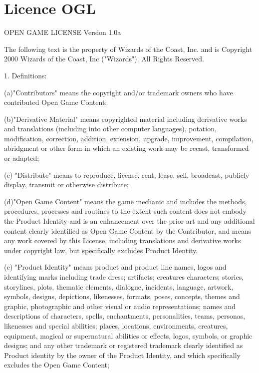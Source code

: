 \documentclass[11pt]{article}
\begin{document}
\newpage
{}\section*{Licence OGL}
\label{OGL}

OPEN GAME LICENSE Version 1.0a

\bigskip

The following text is the property of Wizards of the Coast, Inc. and is Copyright 2000 Wizards of the Coast, Inc ("Wizards"). All Rights Reserved.

\bigskip

1. Definitions:

\bigskip

(a)"Contributors" means the copyright and/or trademark owners who have contributed Open Game Content;

\bigskip

(b)"Derivative Material" means copyrighted material including derivative works and translations (including into other computer languages), potation, modification, correction, addition, extension, upgrade, improvement, compilation, abridgment or other form in which an existing work may be recast, transformed or adapted;

\bigskip

(c) "Distribute" means to reproduce, license, rent, lease, sell, broadcast, publicly display, transmit or otherwise distribute;

\bigskip

(d)"Open Game Content" means the game mechanic and includes the methods, procedures, processes and routines to the extent such content does not embody the Product Identity and is an enhancement over the prior art and any additional content clearly identified as Open Game Content by the Contributor, and means any work covered by this License, including translations and derivative works under copyright law, but specifically excludes Product Identity.

\bigskip

(e) "Product Identity" means product and product line names, logos and identifying marks including trade dress; artifacts; creatures characters; stories, storylines, plots, thematic elements, dialogue, incidents, language, artwork, symbols, designs, depictions, likenesses, formats, poses, concepts, themes and graphic, photographic and other visual or audio representations; names and descriptions of characters, spells, enchantments, personalities, teams, personas, likenesses and special abilities; places, locations, environments, creatures, equipment, magical or supernatural abilities or effects, logos, symbols, or graphic designs; and any other trademark or registered trademark clearly identified as Product identity by the owner of the Product Identity, and which specifically excludes the Open Game Content;
\end{document}
